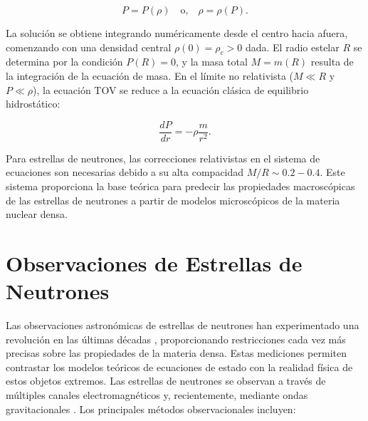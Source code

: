\begin{equation}
	P = P(\rho) \quad \text{o,} \quad \rho = \rho(P).
	\label{eq:ecuacion_estado}
\end{equation}


La solución se obtiene integrando numéricamente desde el centro hacia afuera, comenzando con una densidad central $\rho(0) = \rho_c > 0$ dada. El radio estelar $R$ se determina por la condición $P(R) = 0$, y la masa total $M = m(R)$ resulta de la integración de la ecuación de masa. En el límite no relativista ($M \ll R$ y $P \ll \rho$), la ecuación TOV se reduce a la ecuación clásica de equilibrio hidrostático:

\begin{equation}
	\frac{dP}{dr} = -\rho \frac{m}{r^2}.
\end{equation}

Para estrellas de neutrones, las correcciones relativistas en el sistema de ecuaciones son necesarias debido a su alta compacidad $M/R \sim 0.2-0.4$. Este sistema proporciona la base teórica para predecir las propiedades macroscópicas de las estrellas de neutrones a partir de modelos microscópicos de la materia nuclear densa.

\section{Observaciones de Estrellas de Neutrones}
\label{sec:obsNS}

Las observaciones astronómicas de estrellas de neutrones han experimentado una revolución en las últimas décadas \cite{pianMergersBinaryNeutron2021}, proporcionando restricciones cada vez más precisas sobre las propiedades de la materia densa. Estas mediciones permiten contrastar los modelos teóricos de ecuaciones de estado con la realidad física de estos objetos extremos. Las estrellas de neutrones se observan a través de múltiples canales electromagnéticos \cite{glendenningCompactStarsNuclear2000} y, recientemente, mediante ondas gravitacionales \cite{fonsecaNANOGravNineyearData2016}. Los principales métodos observacionales incluyen:

